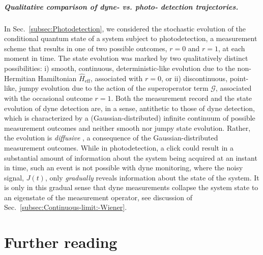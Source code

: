 \subparagraph{Qualitative comparison of dyne- vs. photo- detection trajectories. }

In Sec.~\ref{subsec:Photodetection}, we considered the stochastic
evolution of the conditional quantum state of a system subject to
photodetection, a measurement scheme that results in one of two possible
outcomes, $r=0$ and $r=1$, at each moment in time. The state evolution
was marked by two qualitatively distinct possibilities: i) smooth,
continuous, deterministic-like evolution due to the non-Hermitian
Hamiltonian $\hat{H}_{\mathrm{eff}}$, associated with $r=0$, or
ii) discontinuous, point-like, jumpy evolution due to the action of
the superoperator term $\mathcal{G}$, associated with the occasional
outcome $r=1$. Both the measurement record and the state evolution
of dyne detection are, in a sense, antithetic to those of dyne detection,
which is characterized by a (Gaussian-distributed) infinite continuum
of possible measurement outcomes and neither smooth nor jumpy state
evolution. Rather, the evolution is \emph{diffusive} \citep{Gisin1992},
a consequence of the Gaussian-distributed measurement outcomes. While
in photodetection, a click could result in a substantial amount of
information about the system being acquired at an instant in time,
such an event is not possible with dyne monitoring, where the noisy
signal, $J\left(t\right)$, only \emph{gradually} reveals information
about the state of the system. It is only in this gradual sense that
dyne measurements collapse the system state to an eigenstate of the
measurement operator, see discussion of Sec.~\ref{subsec:Continuous-limit:-Wiener}. 


\section{Further reading \label{sec:Further-reading-traj-thry}}

